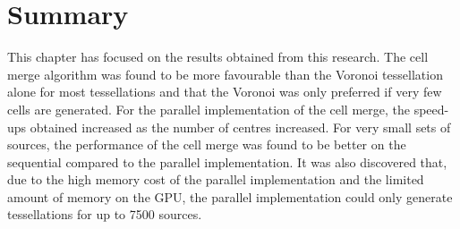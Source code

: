 \section{Summary}
This chapter has focused on the results obtained from this research. The cell merge algorithm was found to be more favourable than the Voronoi tessellation alone for most tessellations and that the Voronoi was only preferred if very few cells are generated. For the parallel implementation of the cell merge, the speed-ups obtained increased as the number of centres increased. For very small sets of sources, the performance of the cell merge was found to be better on the sequential compared to the parallel implementation. It was also discovered that, due to the high memory cost of the parallel implementation and the limited amount of memory on the GPU, the parallel implementation could only generate tessellations for up to 7500 sources.
